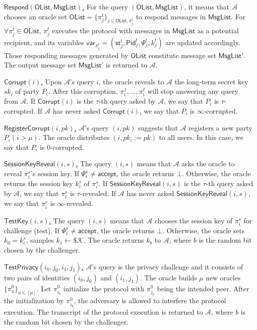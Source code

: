 \documentclass[a4paper,11pt]{article}
\begin{document}
\begin{sloppypar}
\smallskip\noindent\uline{$\mathsf{Respond}(\mathsf{OList}, \mathsf{MsgList})$.} For the query $(\mathsf{OList}, \mathsf{MsgList})$, it means that $\mathcal{A}$ chooses an oracle set $\mathsf{OList} = \{\pi_j^t\}_{j \in \mathsf{OList}, \pi_j^t}$ to respond messages in $\mathsf{MsgList}$. For $\forall \pi_j^t \in \mathsf{OList}$, $\pi_j^t$ executes the protocol with messages in $\mathsf{MsgList}$ as a potential recipient, and its variables $\mathsf{var}_{\pi_j^t} = (\mathsf{st}_j^t, \mathsf{Pid}_j^t, \Psi_j^t, k_j^t)$ are updated accordingly. Those responding messages generated by $\mathsf{OList}$ constitute message set $\mathsf{MsgList}'$. The output message set $\mathsf{MsgList}'$ is returned to $\mathcal{A}$.

\smallskip\noindent\uline{$\mathsf{Corrupt}(i)$.} Upon $\mathcal{A}$'s query $i$, the oracle reveals to $\mathcal{A}$ the long-term secret key $sk_i$ of party $P_i$. After this corruption, $\pi_i^1, \ldots, \pi_i^\ell$ will stop answering any query from $\mathcal{A}$. If $\mathsf{Corrupt}(i)$ is the $\tau$-th query asked by $\mathcal{A}$, we say that $P_i$ is $\tau$-corrupted. If $\mathcal{A}$ has never asked $\mathsf{Corrupt}(i)$, we say that $P_i$ is $\infty$-corrupted.

\smallskip\noindent\uline{$\mathsf{RegisterCorrupt}(i, pk)$.} $\mathcal{A}$'s query $(i, pk)$ suggests that $\mathcal{A}$ registers a new party $P_i (i > \mu)$. The oracle distributes $(i, pk_i := pk)$ to all users. In this case, we say that $P_i$ is $0$-corrupted.

\smallskip\noindent\uline{$\mathsf{SessionKeyReveal}(i, s)$.} The query $(i, s)$ means that $\mathcal{A}$ asks the oracle to reveal $\pi_i^s$'s session key. If $\Psi_i^s \neq \mathsf{accept}$, the oracle returns $\bot$. Otherwise, the oracle returns the session key $k_i^s$ of $\pi_i^s$. If $\mathsf{SessionKeyReveal}(i, s)$ is the $\tau$-th query asked by $\mathcal{A}$, we say that $\pi_i^s$ is $\tau$-revealed. If $\mathcal{A}$ has never asked $\mathsf{SessionKeyReveal}(i, s)$, we say that $\pi_i^s$ is $\infty$-revealed.

\smallskip\noindent\uline{$\mathsf{TestKey}(i, s)$.} The query $(i, s)$ means that $\mathcal{A}$ chooses the session key of $\pi_i^s$ for challenge (test). If $\Psi_i^s \neq \mathsf{accept}$, the oracle returns $\bot$. Otherwise, the oracle sets $k_0 = k_i^s$, samples $k_1 \gets \$ \mathcal{K}$. The oracle returns $k_b$ to $\mathcal{A}$, where $b$ is the random bit chosen by the challenger.

\smallskip\noindent\uline{$\mathsf{TestPrivacy}(i_0, j_0, i_1, j_1)$.} $\mathcal{A}$'s query is the privacy challenge and it consists of two pairs of identities $(i_0, j_0)$ and $(i_1, j_1)$. The oracle builds $\mu$ new oracles $\{\pi_u^0\}_{u \in [\mu]}$. Let $\pi_{i_b}^0$ initialize the protocol with $\pi_{j_b}^0$ being the intended peer. After the initialization by $\pi_{i_b}^0$, the adversary is allowed to interfere the protocol execution. The transcript of the protocol execution is returned to $\mathcal{A}$, where $b$ is the random bit chosen by the challenger.


\end{sloppypar}
\end{document}
